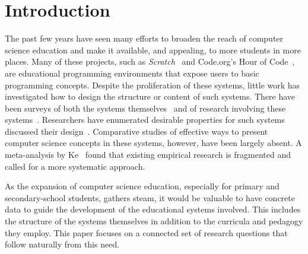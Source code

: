 \documentclass{sig-alternate}
\begin{document}



\section{Introduction}
The past few years have seen many efforts to broaden the reach of computer science education and make it available, and appealing, to more students in more places. 
Many of these projects, such as \emph{Scratch}~\cite{scratch} and Code.org's Hour of Code~\cite{codedotorg}, are educational programming environments that expose users to basic programming concepts. 
Despite the proliferation of these systems, little work has investigated how to design the structure or content of such systems. There have been surveys of both the systems themselves~\cite{guzdial2004programming, kelleher2005lowering} and of research involving these systems~\cite{salleh2013analysis, backlund2013educational}. Researchers have enumerated desirable properties for such systems~\cite{repenning2010scalable} discussed their design~\cite{powers2006tools}.
Comparative studies of effective ways to present computer science concepts in these systems, however, have been largely absent. A meta-analysis by Ke~\cite{ke2009qualitative} found that existing empirical research is fragmented and called for a more systematic approach.

As the expansion of computer science education, especially for primary and secondary-school students, gathers steam, it would be valuable to have concrete data to guide the development of the educational systems involved. 
This includes the structure of the systems themselves in addition to the curricula and pedagogy they employ. 
This paper focuses on a connected set of research questions that follow naturally from this need.
\end{document}
